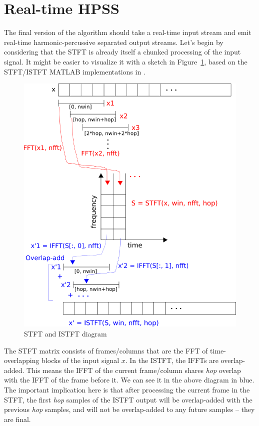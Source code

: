 \documentclass[letter,12pt]{article}
\begin{document}
\vfill
\clearpage %

\section{Real-time HPSS}

The final version of the algorithm should take a real-time input stream and emit real-time harmonic-percussive separated output streams. Let's begin by considering that the STFT is already itself a chunked processing of the input signal. It might be easier to visualize it with a sketch in Figure~\ref{fig:stftdiag}, based on the STFT/ISTFT MATLAB implementations in \cite{stftchunks1}.

\begin{figure}[ht]
	\centering
	\includegraphics[width=12cm]{../images/stft_diagram.png}
	\caption{STFT and ISTFT diagram}
	\label{fig:stftdiag}
\end{figure}

The STFT matrix consists of frames/columns that are the FFT of time-overlapping blocks of the input signal $x$. In the ISTFT, the IFFTs are overlap-added. This means the IFFT of the current frame/column shares \textit{hop} overlap with the IFFT of the frame before it. We can see it in the above diagram in blue. The important implication here is that after processing the current frame in the STFT, the first \textit{hop} samples of the ISTFT output will be overlap-added with the previous \textit{hop} samples, and will not be overlap-added to any future samples -- they are final.\\
\end{document}
